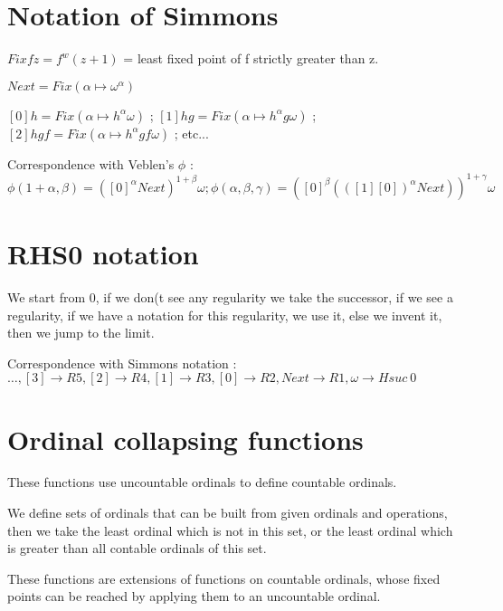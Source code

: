 \documentclass[8pt]{article}
\begin{document}
\section{Notation of Simmons}
\vspace{-0.4cm}
\( Fix f z = f^w(z+1)\) = least fixed point of f strictly greater than z.

\( Next = Fix (\alpha \mapsto \omega^\alpha) \) 

\( [0] h = Fix (\alpha \mapsto h^\alpha \omega) \) ;
\( [1] h g = Fix (\alpha \mapsto h^\alpha g \omega) \) ;
\( [2] h g f = Fix (\alpha \mapsto h^\alpha g f \omega) \) ; etc...

Correspondence with Veblen's \(\phi\) : \( \phi(1+\alpha,\beta) = ([0]^\alpha Next)^{1+\beta} \omega ; 
 \phi(\alpha,\beta,\gamma) = ([0]^\beta (([1] [0])^\alpha Next))^{1+\gamma} \omega \)


\vspace{-0.6cm}

\section{RHS0 notation}
\vspace{-0.4cm}
We start from 0, if we don(t see any regularity we take the successor, if we see a regularity, if we have a notation for this regularity, we use it, else we invent it, then we jump to the limit.

Correspondence with Simmons notation : 
\( \ldots, [3] \rightarrow R5, [2] \rightarrow R4, [1] \rightarrow R3, [0] \rightarrow R2, Next \rightarrow R1, \omega \rightarrow H suc\ 0 \)

\vspace{-0.6cm}

\section{Ordinal collapsing functions}
\vspace{-0.4cm}
These functions use uncountable ordinals to define countable ordinals.

We define sets of ordinals that can be built from given ordinals and operations, then we take the least ordinal which is not in this set, or the least ordinal which is greater than all contable ordinals of this set.

These functions are extensions of functions on countable ordinals, whose fixed points can be reached by applying them to an uncountable ordinal.
\end{document}
